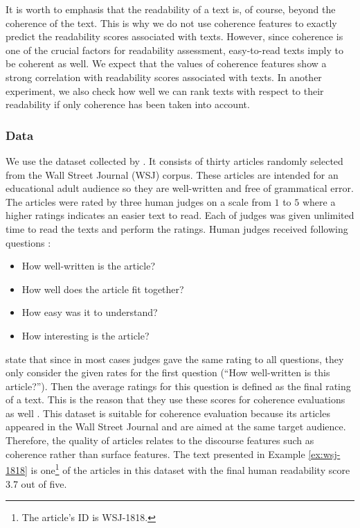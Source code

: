 It is worth to emphasis that the readability of a text is, of course, beyond the coherence of the text. 
This is why we do not use coherence features to exactly predict the readability scores associated with texts. 
However, since coherence is one of the crucial factors for readability assessment, easy-to-read texts imply to be coherent as well. 
We expect that the values of coherence features show a strong correlation with readability scores associated with texts. 
In another experiment, we also check how well we can rank texts with respect to their readability if only coherence has been taken into account. 


\subsubsection{Data}
\label{sec:data_pitler}
We use the dataset collected by . 
It consists of thirty articles randomly selected from the Wall Street Journal (WSJ) corpus. 
These articles are intended for an educational adult audience so they are well-written and free of grammatical error. 
The articles were rated by three human judges on a scale from $1$ to $5$ where a higher ratings indicates an easier text to read. 
Each of judges was given unlimited time to read the texts and perform the ratings. 
Human judges received following questions \cite{pitler08}:
\begin{itemize}
	\item How well-written is the article?
	\item How well does the article fit together?
	\item How easy was it to understand?
	\item How interesting is the article?
\end{itemize} 
 
 state that since in most cases judges gave the same rating to all questions, they only consider the given rates for the first question (``How well-written is this article?''). 
Then the average ratings for this question is defined as the final rating of a text. 
This is the reason that they use these scores for coherence evaluations as well \cite{pitler08}. 
This dataset is suitable for coherence evaluation because its articles appeared in the Wall Street Journal and are aimed at the same target audience. 
Therefore, the quality of articles relates to the discourse features such as coherence rather than surface features. 
The text presented in Example \ref{ex:wsj-1818} is one\footnote{The article's ID is WSJ-1818.} of the articles in this dataset with the final human readability score 3.7 out of five.  


